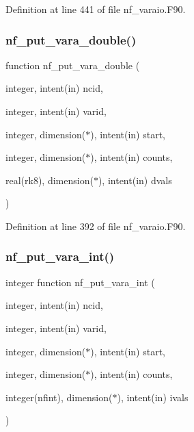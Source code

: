Definition at line 441 of file nf\+\_\+varaio.\+F90.

\mbox{\label{nf__varaio_8F90_a5ff3341e2b0836cdc1c41206e1c39bb9}} 
\subsubsection{\texorpdfstring{nf\+\_\+put\+\_\+vara\+\_\+double()}{nf\_put\_vara\_double()}}
{\footnotesize\ttfamily function nf\+\_\+put\+\_\+vara\+\_\+double (\begin{DoxyParamCaption}\item[{integer, intent(in)}]{ncid,  }\item[{integer, intent(in)}]{varid,  }\item[{integer, dimension($\ast$), intent(in)}]{start,  }\item[{integer, dimension($\ast$), intent(in)}]{counts,  }\item[{real(rk8), dimension($\ast$), intent(in)}]{dvals }\end{DoxyParamCaption})}



Definition at line 392 of file nf\+\_\+varaio.\+F90.

\mbox{\label{nf__varaio_8F90_a235e77681111d14023a2a4138544850c}} 
\subsubsection{\texorpdfstring{nf\+\_\+put\+\_\+vara\+\_\+int()}{nf\_put\_vara\_int()}}
{\footnotesize\ttfamily integer function nf\+\_\+put\+\_\+vara\+\_\+int (\begin{DoxyParamCaption}\item[{integer, intent(in)}]{ncid,  }\item[{integer, intent(in)}]{varid,  }\item[{integer, dimension($\ast$), intent(in)}]{start,  }\item[{integer, dimension($\ast$), intent(in)}]{counts,  }\item[{integer(nfint), dimension($\ast$), intent(in)}]{ivals }\end{DoxyParamCaption})}



